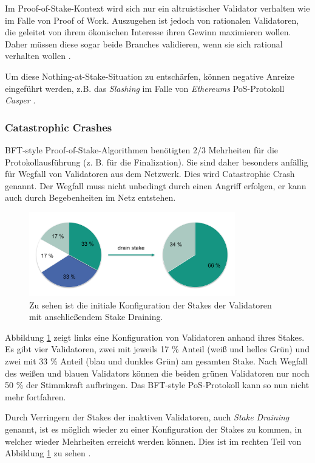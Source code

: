 
Im Proof-of-Stake-Kontext wird sich nur ein altruistischer Validator verhalten wie im Falle von Proof of Work. 
Auszugehen ist jedoch von rationalen Validatoren, die geleitet von ihrem ökonischen Interesse ihren Gewinn maximieren wollen. 
Daher müssen diese sogar beide Branches validieren, wenn sie sich rational verhalten wollen \cite[S. 47f.]{ouroboros}.

Um diese Nothing-at-Stake-Situation zu entschärfen, können negative Anreize eingeführt werden, z.B. das \textit{Slashing} im Falle von \textit{Ethereums} PoS-Protokoll \textit{Casper} \cite[S.1, S. 5f.]{casper_ffg}.

\subsubsection{Catastrophic Crashes}

BFT-style Proof-of-Stake-Algorithmen benötigten $2/3$ Mehrheiten für die Protokollausführung (z. B. für die Finalization). Sie sind daher besonders anfällig für Wegfall von Validatoren aus dem Netzwerk. Dies wird Catastrophic Crash genannt. Der Wegfall muss nicht unbedingt durch einen Angriff erfolgen, er kann auch durch Begebenheiten im Netz entstehen.

\begin{figure}[htb] 
	\centerline{\includegraphics*[width=0.8\textwidth]{img/cat_crashes}}
\caption{Zu sehen ist die initiale Konfiguration der Stakes der Validatoren mit anschließendem Stake Draining.} 
\label{fig:cat_crash}
\end{figure}

Abbildung \ref{fig:cat_crash} zeigt links eine Konfiguration von Validatoren anhand ihres Stakes.
Es gibt vier Validatoren, zwei mit jeweils 17 \% Anteil (weiß und helles Grün) und zwei mit 33 \% Anteil (blau und dunkles Grün) am gesamten Stake.
Nach Wegfall des weißen und blauen Validators können die beiden grünen Validatoren nur noch 50 \% der Stimmkraft aufbringen. Das BFT-style PoS-Protokoll kann so nun nicht mehr fortfahren.

Durch Verringern der Stakes der inaktiven Validatoren, auch \textit{Stake Draining} genannt, ist es möglich wieder zu einer Konfiguration der Stakes zu kommen, in welcher wieder Mehrheiten erreicht werden können. Dies ist im rechten Teil von Abbildung \ref{fig:cat_crash} zu sehen \cite[S. 8f.]{casper_ffg}.